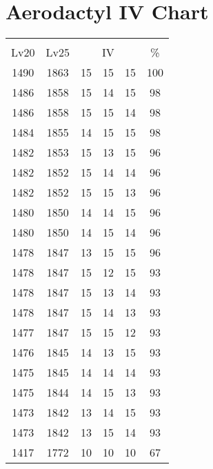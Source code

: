\documentclass{article}%
\begin{document}
%
\normalsize%
\section{Aerodactyl IV Chart}%
\label{sec:Aerodactyl IV Chart}%
\renewcommand{\arraystretch}{1.5}%
\begin{tabular}{|c|c|c|c|c|c|}%
\hline%
\multicolumn{6}{|c|}{\textcolor{white}{ 
\linebreak{Aerodactyl}
}%
\cellcolor{black}}\\%
\multicolumn{1}{|c}{Lv20}&\multicolumn{1}{c|}{Lv25}&\multicolumn{3}{c|}{IV}&\multicolumn{1}{|c|}{\%}\\%
\hline%
\rowcolor{color100}%
1490&1863&15&15&15&100\\%
\hline%
\rowcolor{color98}%
1486&1858&15&14&15&98\\%
\hline%
\rowcolor{color98}%
1486&1858&15&15&14&98\\%
\hline%
\rowcolor{color98}%
1484&1855&14&15&15&98\\%
\hline%
\rowcolor{color96}%
1482&1853&15&13&15&96\\%
\hline%
\rowcolor{color96}%
1482&1852&15&14&14&96\\%
\hline%
\rowcolor{color96}%
1482&1852&15&15&13&96\\%
\hline%
\rowcolor{color96}%
1480&1850&14&14&15&96\\%
\hline%
\rowcolor{color96}%
1480&1850&14&15&14&96\\%
\hline%
\rowcolor{color96}%
1478&1847&13&15&15&96\\%
\hline%
\rowcolor{color93}%
1478&1847&15&12&15&93\\%
\hline%
\rowcolor{color93}%
1478&1847&15&13&14&93\\%
\hline%
\rowcolor{color93}%
1478&1847&15&14&13&93\\%
\hline%
\rowcolor{color93}%
1477&1847&15&15&12&93\\%
\hline%
\rowcolor{color93}%
1476&1845&14&13&15&93\\%
\hline%
\rowcolor{color93}%
1475&1845&14&14&14&93\\%
\hline%
\rowcolor{color93}%
1475&1844&14&15&13&93\\%
\hline%
\rowcolor{color93}%
1473&1842&13&14&15&93\\%
\hline%
\rowcolor{color93}%
1473&1842&13&15&14&93\\%
\hline%
\rowcolor{color91}%
1417&1772&10&10&10&67\\%
\end{tabular}

%
\end{document}
